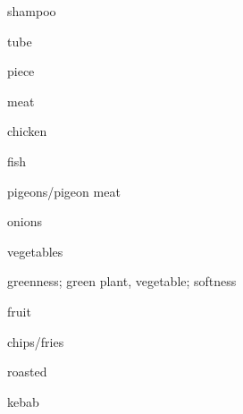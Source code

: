 \begin{flashcard}{\LARGE shampoo}
\LARGE {}
\end{flashcard}
\begin{flashcard}{\LARGE tube}
\LARGE {}
\end{flashcard}
\begin{flashcard}{\LARGE piece}
\LARGE {}
\end{flashcard}
\begin{flashcard}{\LARGE meat}
\LARGE {}
\end{flashcard}
\begin{flashcard}{\LARGE chicken}
\LARGE {}
\end{flashcard}
\begin{flashcard}{\LARGE fish}
\LARGE {}
\end{flashcard}
\begin{flashcard}{\LARGE pigeons/pigeon meat}
\LARGE {}
\end{flashcard}
\begin{flashcard}{\LARGE onions}
\LARGE {}
\end{flashcard}
\begin{flashcard}{\LARGE vegetables}
\LARGE {}
\end{flashcard}
\begin{flashcard}{\LARGE greenness; green plant, vegetable; softness}
\LARGE {}
\end{flashcard}
\begin{flashcard}{\LARGE fruit}
\LARGE {}
\end{flashcard}
\begin{flashcard}{\LARGE chips/fries}
\LARGE {}
\end{flashcard}
\begin{flashcard}{\LARGE roasted}
\LARGE {}
\end{flashcard}
\begin{flashcard}{\LARGE kebab}
\LARGE {}
\end{flashcard}
